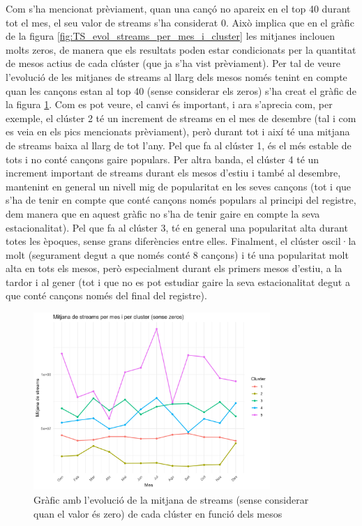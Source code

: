 Com s'ha mencionat prèviament, quan una cançó no apareix en el top 40 durant tot el mes, el seu valor de streams s'ha considerat 0. Això implica que en el gràfic de la figura \ref{fig:TS_evol_streams_per_mes_i_cluster} les mitjanes inclouen molts zeros, de manera que els resultats poden estar condicionats per la quantitat de mesos actius de cada clúster (que ja s'ha vist prèviament). Per tal de veure l'evolució de les mitjanes de streams al llarg dels mesos només tenint en compte quan les cançons estan al top 40 (sense considerar els zeros) s'ha creat el gràfic de la figura \ref{fig:TS_evol_streams_per_mes_i_cluster_no_zeros}. Com es pot veure, el canvi és important, i ara s'aprecia com, per exemple, el clúster 2 té un increment de streams en el mes de desembre (tal i com es veia en els pics mencionats prèviament), però durant tot i així té una mitjana de streams baixa al llarg de tot l'any. Pel que fa al clúster 1, és el més estable de tots i no conté cançons gaire populars. Per altra banda, el clúster 4 té un increment important de streams durant els mesos d'estiu i també al desembre, mantenint en general un nivell mig de popularitat en les seves cançons (tot i que s'ha de tenir en compte que conté cançons només populars al principi del registre, dem manera que en aquest gràfic no s'ha de tenir gaire en compte la seva estacionalitat). Pel que fa al clúster 3, té en general una popularitat alta durant totes les èpoques, sense grans diferències entre elles. Finalment, el clúster oscil·la molt (segurament degut a que només conté 8 cançons) i té una popularitat molt alta en tots els mesos, però especialment durant els primers mesos d'estiu, a la tardor i al gener (tot i que no es pot estudiar gaire la seva estacionalitat degut a que conté cançons només del final del registre).

\begin{figure}[H]
    \centering
    \includegraphics[width=0.8\textwidth]{Images/4_clustering/time_series/evol_streams_per_mes_i_cluster_no_0.png}
    \caption{Gràfic amb l'evolució de la mitjana de streams (sense considerar quan el valor és zero) de cada clúster en funció dels mesos}
    \label{fig:TS_evol_streams_per_mes_i_cluster_no_zeros}
\end{figure}

